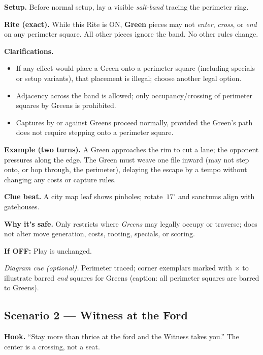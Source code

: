 \documentclass[11pt]{article}
\numberwithin{equation}{section} %
\theoremstyle{plain} %
\theoremstyle{definition} %
\theoremstyle{remark} %
\begin{document}
\medskip
\noindent\textbf{Setup.} Before normal setup, lay a visible \emph{salt-band} tracing the perimeter ring.

\medskip
\noindent\textbf{Rite (exact).} While this Rite is \textsc{ON}, \textbf{Green} pieces may not \emph{enter}, \emph{cross}, or \emph{end} on any perimeter square. All other pieces ignore the band. No other rules change.

\medskip
\noindent\textbf{Clarifications.}
\begin{itemize}\setlength\itemsep{0.25em}
  \item If any effect would place a Green onto a perimeter square (including specials or setup variants), that placement is illegal; choose another legal option.
  \item Adjacency across the band is allowed; only occupancy/crossing of perimeter squares by Greens is prohibited.
  \item Captures by or against Greens proceed normally, provided the Green’s path does not require stepping onto a perimeter square.
\end{itemize}

\medskip
\noindent\textbf{Example (two turns).}  
A Green approaches the rim to cut a lane; the opponent pressures along the edge. The Green must weave one file inward (may not step onto, or hop through, the perimeter), delaying the escape by a tempo without changing any costs or capture rules.

\medskip
\noindent\textbf{Clue beat.} A city map leaf shows pinholes; rotate \(\,17^\circ\) and sanctums align with gatehouses.

\medskip
\noindent\textbf{Why it’s safe.} Only restricts where \emph{Greens} may legally occupy or traverse; does not alter move generation, costs, rooting, specials, or scoring.

\medskip
\noindent\textbf{If \textsc{OFF}:} Play is unchanged.

\medskip
\noindent\textit{Diagram cue (optional).} Perimeter traced; corner exemplars marked with \(\times\) to illustrate barred \emph{end} squares for Greens (caption: all perimeter squares are barred to Greens).

\subsection{Scenario 2 — Witness at the Ford}
\label{scen:witness-ford}

\noindent\textbf{Hook.} “Stay more than thrice at the ford and the Witness takes you.” The center is a crossing, not a seat.
\end{document}
